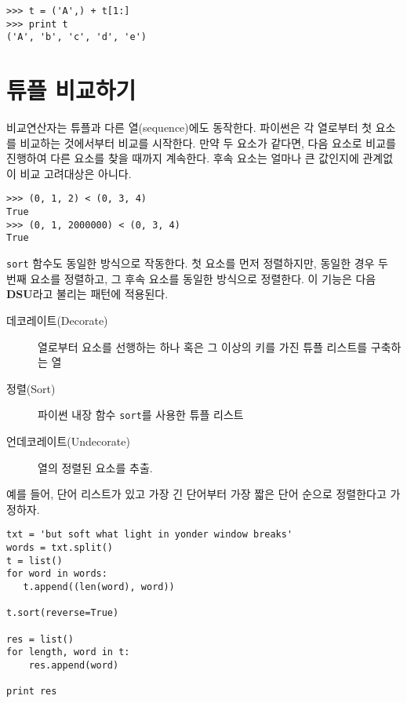 \beforeverb
\begin{verbatim}
>>> t = ('A',) + t[1:]
>>> print t
('A', 'b', 'c', 'd', 'e')
\end{verbatim}
\afterverb
%

\section{튜플 비교하기}


비교연산자는 튜플과 다른 열(sequence)에도 동작한다. 파이썬은 각 열로부터 첫 요소를 비교하는 것에서부터 비교를 시작한다.
만약 두 요소가 같다면, 다음 요소로 비교를 진행하여 다른 요소를 찾을 때까지 계속한다. 후속 요소는 얼마나 큰 값인지에 관계없이 비교 고려대상은 아니다.

\beforeverb
\begin{verbatim}
>>> (0, 1, 2) < (0, 3, 4)
True
>>> (0, 1, 2000000) < (0, 3, 4)
True
\end{verbatim}
\afterverb
%

{\tt sort} 함수도 동일한 방식으로 작동한다.
첫 요소를 먼저 정렬하지만, 동일한 경우 두 번째 요소를 정렬하고, 그 후속 요소를 동일한 방식으로 정렬한다.
이 기능은 다음 {\bf DSU}라고 불리는 패턴에 적용된다.

\begin{description}

\item[데코레이트(Decorate)] 열로부터 요소를 선행하는 하나 혹은 그 이상의 키를 가진 튜플 리스트를 구축하는 열

\item[정렬(Sort)] 파이썬 내장 함수 {\tt sort}를 사용한 튜플 리스트

\item[언데코레이트(Undecorate)]  열의 정렬된 요소를 추출.

\end{description}

\label{DSU}
예를 들어, 단어 리스트가 있고 가장 긴 단어부터 가장 짧은 단어 순으로 정렬한다고 가정하자.

\beforeverb
\begin{verbatim}
txt = 'but soft what light in yonder window breaks'
words = txt.split()
t = list()
for word in words:
   t.append((len(word), word))

t.sort(reverse=True)

res = list()
for length, word in t:
    res.append(word)

print res
\end{verbatim}
\afterverb
%

